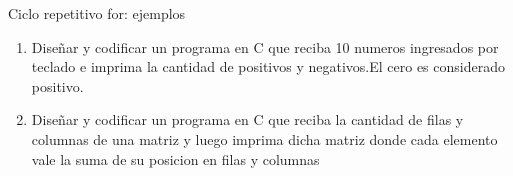 \documentclass[xcolor=pdftex,table,11pt]{beamer}
\begin{document}
\begin{frame}{Ciclo repetitivo for: ejemplos}
 \begin{enumerate}
   
  \item Diseñar y codificar un programa en C que reciba 10 numeros ingresados por teclado e imprima la cantidad de positivos y negativos.El cero es considerado positivo.
\href{https://github.com/danis963/informaticaI_IUA/blob/main/c/src/3-2-for.c}{}


  \item Diseñar y codificar un programa en C que reciba
la cantidad de filas y columnas de una matriz y luego imprima 
dicha matriz donde cada elemento vale la suma de su posicion en filas y columnas
\href{https://github.com/danis963/informaticaI_IUA/blob/main/c/src/3-5-for.c}{}

   \end{enumerate}
   

\end{frame}
\end{document}
